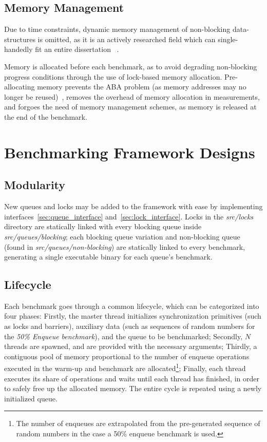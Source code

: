 \subsection{Memory Management}
Due to time constraints, dynamic memory management of non-blocking data-structures
is omitted, as it is an actively researched field which can single-handedly fit
an entire dissertation ~\citep{valois1995datastructures,michael2004hazard}.

Memory is allocated before each benchmark, as to avoid degrading
non-blocking progress conditions through the use of lock-based memory
allocation. Pre-allocating memory prevents the ABA problem (as memory addresses
may no longer be reused)~\citep{dechev2010understanding}, removes the overhead
of memory allocation in measurements, and forgoes the need of memory management
schemes, as memory is released at the end of the benchmark.

\section{Benchmarking Framework Designs}
\subsection{Modularity}
New queues and locks may be added to the framework with ease by implementing
interfaces~\ref{sec:queue_interface} and~\ref{sec:lock_interface}. Locks in the
\emph{src/locks} directory are statically linked with every blocking queue
inside \emph{src/queues/blocking}; each blocking
queue variation and non-blocking queue (found in
\emph{src/queues/non-blocking}) are statically linked to every benchmark,
generating a single executable binary for each queue's benchmark. 

\subsection{Lifecycle}
Each benchmark goes through a common lifecycle, which can be categorized into
four phases: 
Firstly, the master thread initializes synchronization primitives
(such as locks and barriers), auxiliary data (such as
sequences of random numbers for the \emph{50\% Enqueue benchmark}), and the
queue to be benchmarked; 
Secondly, $N$ threads are spawned, and are provided
with the necessary arguments;
Thirdly, a contiguous pool of memory proportional
to the number of enqueue operations executed in the warm-up and benchmark are
allocated\footnote{The number of enqueues are extrapolated from the
pre-generated sequence of random numbers in the case a 50\% enqueue benchmark
is used.};
Finally, each thread executes its share of operations and waits until each
thread has finished, in order to safely free up the allocated memory. The
entire cycle is repeated using a newly initialized queue.

